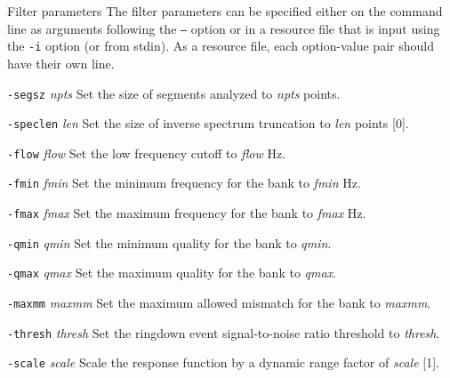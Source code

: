 \begin{entry}
\item[Filter parameters]\leavevmode
The filter parameters can be specified either on the  command  line  as
arguments  following the \texttt{--} option or in a resource file that is input
using the \texttt{-i} option  (or  from stdin).  As a resource file, each
option-value pair should have their own line.
\begin{entry}
\item[\texttt{-segsz} \textit{npts}]
Set the size of segments analyzed to \textit{npts} points.
\item[\texttt{-speclen} \textit{len}]
Set the size of inverse spectrum truncation to \textit{len} points [0].
\item[\texttt{-flow} \textit{flow}]
Set the low frequency cutoff to \textit{flow} Hz.
\item[\texttt{-fmin} \textit{fmin}]
Set the minimum frequency for the bank to \textit{fmin} Hz.
\item[\texttt{-fmax} \textit{fmax}]
Set the maximum frequency for the bank to \textit{fmax} Hz.
\item[\texttt{-qmin} \textit{qmin}]
Set the minimum quality for the bank to \textit{qmin}.
\item[\texttt{-qmax} \textit{qmax}]
Set the maximum quality for the bank to \textit{qmax}.
\item[\texttt{-maxmm} \textit{maxmm}]
Set  the  maximum  allowed mismatch for the bank to \textit{maxmm}.
\item[\texttt{-thresh} \textit{thresh}]
Set the ringdown event signal-to-noise ratio threshold to \textit{thresh}.
\item[\texttt{-scale} \textit{scale}]
Scale the response function by a dynamic range factor of \textit{scale} [1].
\end{entry}


\end{entry}
